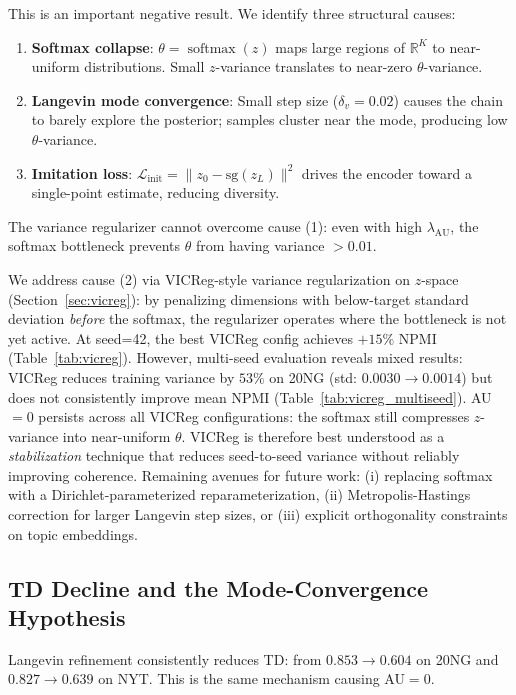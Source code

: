 \documentclass[10pt]{article}
\newcommand{\R}{\mathbb{R}}
\newcommand{\sg}{\mathrm{sg}}
\DeclareMathOperator{\softmax}{softmax}
\begin{document}
This is an important negative result. We identify three structural causes:
\begin{enumerate}
    \item \textbf{Softmax collapse}: $\theta = \softmax(z)$ maps large regions of
    $\R^K$ to near-uniform distributions. Small $z$-variance translates to
    near-zero $\theta$-variance.
    \item \textbf{Langevin mode convergence}: Small step size ($\delta_v = 0.02$)
    causes the chain to barely explore the posterior; samples cluster near the mode,
    producing low $\theta$-variance.
    \item \textbf{Imitation loss}: $\mathcal{L}_{\mathrm{init}} = \|z_0 - \sg(z_L)\|^2$
    drives the encoder toward a single-point estimate, reducing diversity.
\end{enumerate}

The variance regularizer cannot overcome cause (1): even with high $\lambda_{\mathrm{AU}}$,
the softmax bottleneck prevents $\theta$ from having variance $> 0.01$.

We address cause (2) via VICReg-style variance regularization on $z$-space
(Section~\ref{sec:vicreg}): by penalizing dimensions with below-target standard deviation
\emph{before} the softmax, the regularizer operates where the bottleneck is not yet active.
At seed=42, the best VICReg config achieves $+15\%$ NPMI (Table~\ref{tab:vicreg}).
However, multi-seed evaluation reveals mixed results: VICReg reduces training variance
by $53\%$ on 20NG (std: $0.0030 \to 0.0014$) but does not consistently improve
mean NPMI (Table~\ref{tab:vicreg_multiseed}).
AU$=0$ persists across all VICReg configurations: the softmax still compresses
$z$-variance into near-uniform $\theta$.
VICReg is therefore best understood as a \emph{stabilization} technique that reduces
seed-to-seed variance without reliably improving coherence.
Remaining avenues for future work: (i) replacing softmax with a Dirichlet-parameterized
reparameterization, (ii) Metropolis-Hastings correction for larger Langevin step sizes,
or (iii) explicit orthogonality constraints on topic embeddings.

\subsection{TD Decline and the Mode-Convergence Hypothesis}
\label{sec:td_decline}

Langevin refinement consistently reduces TD: from $0.853 \to 0.604$ on 20NG and
$0.827 \to 0.639$ on NYT. This is the same mechanism causing AU$=0$.
\end{document}
